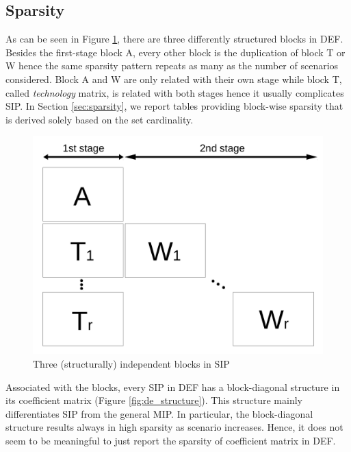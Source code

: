 \subsection{Sparsity} \label{subsec:sparsity}
As can be seen in Figure \ref{fig:stagewise_sparsity}, there are three differently structured blocks in DEF. Besides the first-stage block A, every other block is the duplication of block T or W hence the same sparsity pattern repeats as many as the number of scenarios considered. Block A and W are only related with their own stage while block T, called \textit{technology} matrix, is related with both stages hence it usually complicates SIP. In Section \ref{sec:sparsity}, we report tables providing block-wise sparsity that is derived solely based on the set cardinality.
\begin{figure}[H]
	\centering
	\includegraphics[width=0.5\linewidth]{drawings/stagewise_sparsity}
	\caption{Three (structurally) independent blocks in SIP}
	\label{fig:stagewise_sparsity}
\end{figure}
Associated with the blocks, every SIP in DEF has a block-diagonal structure in its coefficient matrix (Figure \ref{fig:de_structure}). This structure mainly differentiates SIP from the general MIP. In particular, the block-diagonal structure results always in high sparsity as scenario increases. Hence, it does not seem to be meaningful to just report the sparsity of coefficient matrix in DEF.
